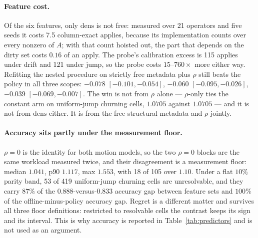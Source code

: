 \documentclass{article}
\begin{document}
\begin{table}[tbp]
  \centering
  \caption{Paired bootstrap over the 21 operators, 4000 resamples, 95\% CI.
  Positive means the first strategy is worse. Bold marks intervals excluding
  zero. The offline side of every contrast is the nested procedure. Every
  non-degenerate scope is listed, including the frozen ones; local-drift
  churning cells are absent because that scope is single-class.}
  \label{tab:contrasts}
  \small
  
\end{table}

\paragraph{Feature cost.} Of the six features, only $\mathrm{dens}$ is not free:
measured over 21 operators and five seeds it costs 7.5 column-exact applies,
because its implementation counts over every nonzero of $A$; with that count
hoisted out, the part that depends on the dirty set costs $0.16$ of an apply.
The probe's calibration excess is 115 applies under drift and 121 under jump, so
the probe costs $15$--$760\times$ more either way. Refitting the nested procedure
on strictly free metadata plus $\rho$ still beats the policy in all three scopes:
$-0.078$ $[-0.101, -0.054]$, $-0.060$ $[-0.095, -0.026]$, $-0.039$ $[-0.069,
-0.007]$. The win is not from $\rho$ alone --- $\rho$-only ties the constant arm
on uniform-jump churning cells, $1.0705$ against $1.0705$ --- and it is not from
$\mathrm{dens}$ either. It is from the free structural metadata and $\rho$
jointly.

\paragraph{Accuracy sits partly under the measurement floor.} $\rho{=}0$ is the
identity for both motion models, so the two $\rho{=}0$ blocks are the same
workload measured twice, and their disagreement is a measurement floor: median
$1.041$, p90 $1.117$, max $1.553$, with 18 of 105 over $1.10$. Under a flat
$10\%$ parity band, 53 of 419 uniform-jump churning cells are unresolvable, and
they carry $87\%$ of the $0.888$-versus-$0.833$ accuracy gap between feature sets
and $100\%$ of the offline-minus-policy accuracy gap. Regret is a different
matter and survives all three floor definitions: restricted to resolvable cells
the contrast keeps its sign and its interval. This is why accuracy is reported
in Table~\ref{tab:predictors} and is not used as an argument.
\end{document}
